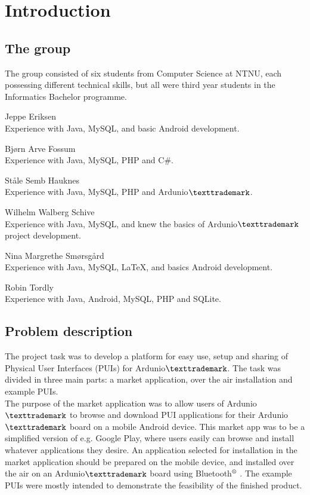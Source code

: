 \chapter{Introduction}
\section{The group}
The group consisted of six students from Computer Science at NTNU, each possessing different technical skills, but all were third year students in the Informatics Bachelor programme.

\begin{description}
	\item{Jeppe Eriksen}\hfill \\
		Experience with Java, MySQL, and basic Android development. 
	\item{Bjørn Arve Fossum}\hfill \\
		Experience with Java, MySQL, PHP and C\#.
	\item{Ståle Semb Hauknes}\hfill \\
		Experience with Java, MySQL, PHP and Ardunio$\texttrademark$.
	\item{Wilhelm Walberg Schive}\hfill \\
		Experience with Java, MySQL, and knew the basics of Ardunio$\texttrademark$ project development.
	\item{Nina Margrethe Smørsgård}\hfill \\
		Experience with Java, MySQL, \LaTeX, and basics Android development.
	\item{Robin Tordly}\hfill \\
		Experience with Java, Android, MySQL, PHP and SQLite. 
\end{description}

\section{Problem description}
The project task was to develop a platform for easy use, setup and sharing of Physical User Interfaces (PUIs) for Ardunio$\texttrademark$. The task was divided in three main parts: a market application, over the air installation and example PUIs.\\
\newline
The purpose of the market application was to allow users of Ardunio$\texttrademark$ to browse and download PUI applications for their Ardunio$\texttrademark$ board on a mobile Android device. This market app was to be a simplified version of e.g. Google Play, where users easily can browse and install whatever applications they desire. An application selected for installation in the market application should be prepared on the mobile device, and installed over the air on an Ardunio$\texttrademark$ board using Bluetooth$\textsuperscript{\textregistered}$ . The example PUIs were mostly intended to demonstrate the feasibility of the finished product.

